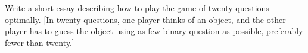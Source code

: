 \newpage
\begin{problem}{5}{24}
  Write a short essay describing how to play the game of twenty questions optimally.  \textnormal{[In twenty questions, one player thinks of an object, and the other player has to guess the object using as few binary question as possible, preferably fewer than twenty.]}
\end{problem}



